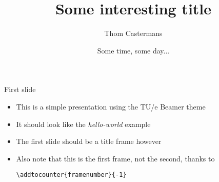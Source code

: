 \documentclass[12pt, aspectratio=169]{beamer} %
\title{Some interesting title}
\author{Thom Castermans}
\date{Some time, some day...}
\begin{document}
\begin{titleframe}
\end{titleframe}
\addtocounter{framenumber}{-1}

\begin{frame}{First slide}
  \begin{itemize}
    \item This is a simple presentation using the TU/e Beamer theme
    \item It should look like the \textit{hello-world} example
    \item The first slide should be a title frame however
    \item Also note that this is the first frame, not the second, thanks to

        \texttt{\textbackslash{}addtocounter\{framenumber\}\{-1\}}
  \end{itemize}
\end{frame}
\end{document}

